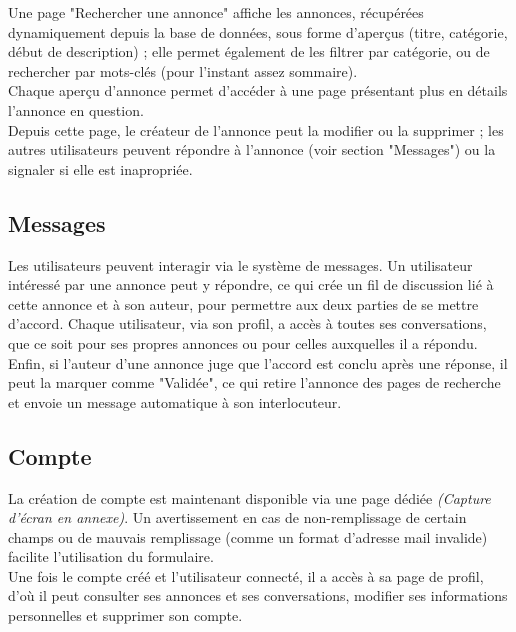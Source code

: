 \documentclass[a4paper,11pt]{article}
\begin{document}
Une page "Rechercher une annonce" affiche les annonces, récupérées dynamiquement depuis la base de données, sous forme d'aperçus (titre, catégorie, début de description) ; elle permet également de les filtrer par catégorie, ou de rechercher par mots-clés (pour l'instant assez sommaire).\\

Chaque aperçu d'annonce permet d'accéder à une page présentant plus en détails l'annonce en question.\\
Depuis cette page, le créateur de l'annonce peut la modifier ou la supprimer ; les autres utilisateurs peuvent répondre à l'annonce (voir section "Messages") ou la signaler si elle est inapropriée.\\

\subsection{Messages}

Les utilisateurs peuvent interagir via le système de messages. Un utilisateur intéressé par une annonce peut y répondre, ce qui crée un fil de discussion lié à cette annonce et à son auteur, pour permettre aux deux parties de se mettre d'accord. Chaque utilisateur, via son profil, a accès à toutes ses conversations, que ce soit pour ses propres annonces ou pour celles auxquelles il a répondu. Enfin, si l'auteur d'une annonce juge que l'accord est conclu après une réponse, il peut la marquer comme "Validée", ce qui retire l'annonce des pages de recherche et envoie un message automatique à son interlocuteur.


\subsection{Compte}

La création de compte est maintenant disponible via une page dédiée \textit{(Capture d'écran en annexe)}. Un avertissement en cas de non-remplissage de certain champs ou de mauvais remplissage (comme un format d'adresse mail invalide) facilite l'utilisation du formulaire.\\
Une fois le compte créé et l'utilisateur connecté, il a accès à sa page de profil, d'où il peut consulter ses annonces et ses conversations, modifier ses informations personnelles et supprimer son compte.


\end{document}
